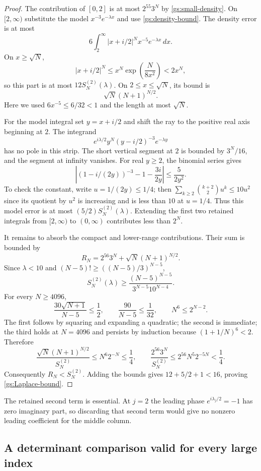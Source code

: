 \begin{proof}
The contribution of $[0,2]$ is at most $2^{55}3^N$ by
\eqref{gs:small-density}.  On $[2,\infty)$ substitute the model
$x^{-3}e^{-\lambda x}$ and use \eqref{gs:density-bound}.
The density error is at most
\[
 6\int_2^\infty|x+i/2|^Nx^{-5}e^{-\lambda x}\,dx.
\]
On $x\ge\sqrt N$,
\[
 |x+i/2|^N\le x^N\exp\left(\frac{N}{8x^2}\right)<2x^N,
\]
so this part is at most $12S_N^{(2)}(\lambda)$.  On
$2\le x\le\sqrt N$, its bound is
\[
                       \sqrt N(N+1)^{N/2}.
\]
Here we used $6x^{-5}\le6/32<1$ and the length at most $\sqrt N$.

For the model integral set $y=x+i/2$ and shift the ray to the
positive real axis beginning at $2$.  The integrand
\[
       e^{i\lambda/2}y^N(y-i/2)^{-3}e^{-\lambda y}
\]
has no pole in this strip.  The short vertical segment at $2$
is bounded by $3^N/16$, and the segment at infinity vanishes.
For real $y\ge2$, the binomial series gives
\[
 \left|(1-i/(2y))^{-3}-1-\frac{3i}{2y}\right|
                  \le\frac5{2y^2}.
\]
To check the constant, write $u=1/(2y)\le1/4$; then
$\sum_{k\ge2}\binom{k+2}{2}u^k\le10u^2$ since its quotient
by $u^2$ is increasing and is less than $10$ at $u=1/4$.
Thus this model error is at most $(5/2)S_N^{(2)}(\lambda)$.
Extending the first two retained integrals from $[2,\infty)$
to $(0,\infty)$ contributes less than $2^N$.

It remains to absorb the compact and lower-range contributions.
Their sum is bounded by
\[
 R_N=2^{56}3^N+\sqrt N(N+1)^{N/2}.
\]
Since $\lambda<10$ and $(N-5)!\ge((N-5)/3)^{N-5}$,
\[
 S_N^{(2)}(\lambda)
 \ge\frac{(N-5)^{N-5}}{3^{N-5}10^{N-4}}.
\]
For every $N\ge4096$,
\[
 \frac{30\sqrt{N+1}}{N-5}\le\frac12,
 \qquad \frac{90}{N-5}\le\frac1{32},
 \qquad N^6\le2^{N-2}.
\]
The first follows by squaring and expanding a quadratic; the second
is immediate; the third holds at $N=4096$ and persists by induction
because $(1+1/N)^6<2$.  Therefore
\[
 \frac{\sqrt N(N+1)^{N/2}}{S_N^{(2)}}
       \le N^6 2^{-N}\le\frac14,
 \qquad
 \frac{2^{56}3^N}{S_N^{(2)}}
       \le2^{56}N^5 2^{-5N}<\frac14.
\]
Consequently $R_N<S_N^{(2)}$.  Adding the bounds gives
$12+5/2+1<16$, proving \eqref{gs:Laplace-bound}.
\end{proof}

The retained second term is essential.  At $j=2$ the leading
phase $e^{i\lambda_j/2}=-1$ has zero imaginary part, so discarding
that second term would give no nonzero leading coefficient for the
middle column.

\subsection{A determinant comparison valid for every large index}

